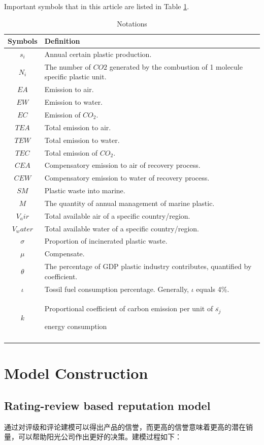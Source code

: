 \documentclass{mcmthesis}
\begin{document}
Important symbols that in this article are listed in Table \ref{notation}.
\begin{table}[H] 
	\caption{Notations} 
	\center
	\begin{tabular}{cp{}}
		\toprule 
		Symbols &Definition  \\ 
		\midrule 
		$s_i $& Annual certain plastic production.  \\ 
		$N_i$ & The number of $CO2$ generated by the combustion of 1 molecule specific plastic unit. \\ 
		$EA$ & Emission to air. \\ 
		$EW$ & Emission to water.\\
		$EC$ & Emission of $CO_2$.\\
		$TEA$ & Total emission to air.\\
		$TEW$ & Total emission to water.\\
		$TEC$ & Total emission of $CO_2$.\\
		$CEA$ & Compensatory emission to air of recovery process.\\
		$CEW$ & Compensatory emission to water of recovery process.\\
		$SM$ & Plastic waste into marine.\\
		$M$ & The quantity of annual management of marine plastic.\\
		$V_air$ & Total available air of a specific country/region.\\
		$V_water$ & Total available water of a specific country/region.\\
		$\sigma$ & Proportion of incinerated plastic waste.\\
		$\mu$ & Compensate.\\
		$\theta$ & The percentage of GDP plastic industry contributes, quantified by coefficient.\\
		$\iota$ & Tossil fuel consumption percentage. Generally, $\iota$ equals 4\%.\\
		$k$ & Proportional coefficient of carbon emission per unit of
		$\overline{s_j}$

energy consumption\\
		\bottomrule 
		\label{notation}
	\end{tabular} 
\end{table}

\section{Model Construction}
\label{lp}
\subsection{Rating-review based reputation model}
通过对评级和评论建模可以得出产品的信誉，而更高的信誉意味着更高的潜在销量，可以帮助阳光公司作出更好的决策。建模过程如下：
\end{document}
